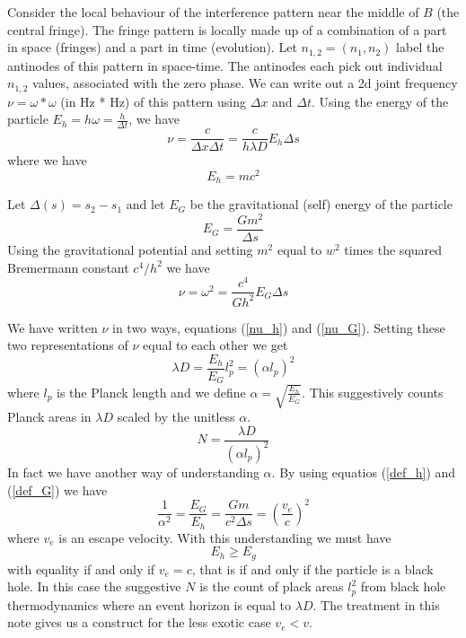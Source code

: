 \documentclass[12pt,a4paper]{article}
\begin{document}
Consider the local behaviour of the interference pattern near the middle of $B$ (the central fringe). The fringe pattern is locally made up of a combination of a part in space (fringes) and a part in time (evolution). Let $n_{1,2} = (n_1, n_2)$ label the antinodes of this pattern in space-time. The antinodes each pick out individual $n_{1,2}$ values, associated with the zero phase. We can write out a 2d joint frequency $\nu = \omega * \omega$ (in Hz * Hz) of this pattern using $\Delta x$ and $\Delta t$.  Using the energy of the particle $E_h = h \omega = \frac{h}{\Delta t}$, we have
\begin{equation}
\label{nu_h}
  \nu = \frac{c}{\Delta x \Delta t} = \frac{c}{h \lambda D} E_h \Delta{s}
\end{equation}
where we have
\begin{equation}
\label{def_h}
E_h = m c^2
\end{equation}


Let $\Delta(s) = s_2 - s_1$ and let $E_G$ be the gravitational (self) energy of the particle
\begin{equation}
\label{def_G}
E_G = \frac{G m^2}{\Delta s}
\end{equation}
Using the gravitational potential and setting $m^2$  equal to $w^2$ times the squared Bremermann constant $c^4/h^2$ we have
\begin{equation}
\label{nu_G}
\nu = \omega^2 = \frac{c^4}{G h^2} E_G \Delta s
\end{equation}


We have written $\nu$ in two ways, equations (\ref{nu_h}) and (\ref{nu_G}). Setting these two representations of $\nu$ equal to each other we get
\[
\lambda D = \frac{E_h}{E_G} l_p^2 = (\alpha l_p)^2
\]
where $l_p$ is the Planck length and we define $\alpha = \sqrt{\frac{E_h}{E_G}}$. This suggestively counts Planck areas in $\lambda D$ scaled by the unitless $\alpha$.
\[
   N = \frac{\lambda D}{(\alpha l_p)^2}
\]
In fact we have another way of understanding $\alpha$.  By using equatios (\ref{def_h}) and (\ref{def_G}) we have
\[
  \frac{1}{\alpha^2} = \frac{E_G}{E_h} = \frac{Gm}{c^2\Delta s} = \left(\frac{v_e}{c}\right)^2
\]
where $v_e$ is an escape velocity.  With this understanding we must have
\[
   E_h \ge E_g
\]
with equality if and only if $v_e = c$, that is if and only if the particle is a black hole.  In this case the suggestive $N$ is the count of plack areas $l_p^2$ from black hole thermodynamics where an event horizon is equal to $\lambda D$. The treatment in this note gives us a construct for the less exotic case $v_e < v$.
\end{document}

